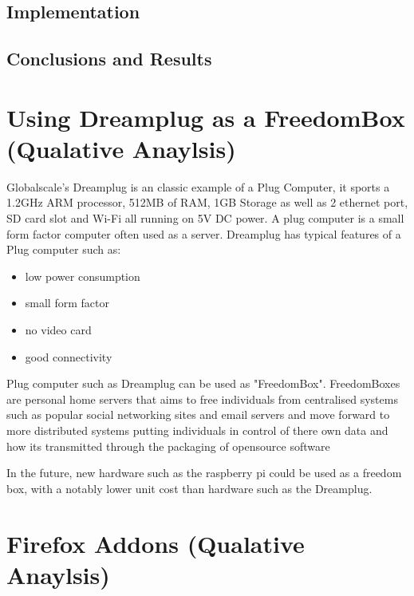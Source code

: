 \documentclass[12pt,a4paper,oneside]{article}
\begin{document}

\subsection{Implementation}

\subsection{Conclusions and Results}


\section{Using Dreamplug as a FreedomBox (Qualative Anaylsis)}

Globalscale's Dreamplug is an classic example of a Plug Computer, it sports a 1.2GHz ARM processor, 512MB of RAM, 1GB Storage as well as 2 ethernet port, SD card slot and Wi-Fi all running on 5V DC power. A plug computer is a small form factor computer often used as a server. Dreamplug has typical features of a Plug computer such as:

\begin{itemize}
\item low power consumption
\item small form factor
\item no video card
\item good connectivity
\end{itemize}

Plug computer such as Dreamplug can be used as "FreedomBox". FreedomBoxes are personal home servers that aims to free individuals from centralised systems such as popular social networking sites and email servers and move forward to more distributed systems putting individuals in control of there own data and how its transmitted through the packaging of opensource software 

In the future, new hardware such as the raspberry pi could be used as a freedom box, with a notably lower unit cost than hardware such as the Dreamplug.

\section{Firefox Addons (Qualative Anaylsis)}
\end{document}
